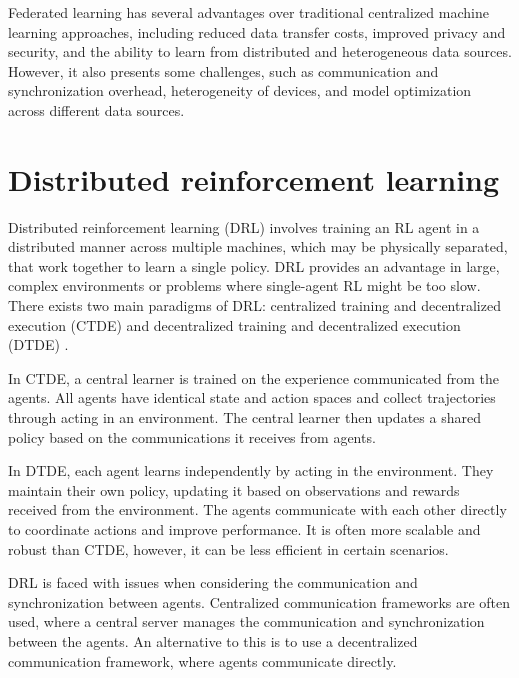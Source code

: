 
Federated learning has several advantages over traditional centralized machine learning approaches, including reduced data transfer costs, improved privacy and security, and the ability to learn from distributed and heterogeneous data sources. However, it also presents some challenges, such as communication and synchronization overhead, heterogeneity of devices, and model optimization across different data sources.

\section{Distributed reinforcement learning}

Distributed reinforcement learning (DRL) involves training an RL agent in a distributed manner across multiple machines, which may be physically separated, that work together to learn a single policy. DRL provides an advantage in large, complex environments or problems where single-agent RL might be too slow.
There exists two main paradigms of DRL: centralized training and decentralized execution (CTDE) and decentralized training and decentralized execution (DTDE) \cite{DRLSurvey}.

In CTDE, a central learner is trained on the experience communicated from the agents. All agents have identical state and action spaces and collect trajectories through acting in an environment. The central learner then updates a shared policy based on the communications it receives from agents. 

In DTDE, each agent learns independently by acting in the environment. They maintain their own policy, updating it based on observations and rewards received from the environment. The agents communicate with each other directly to coordinate actions and improve performance. It is often more scalable and robust than CTDE, however, it can be less efficient in certain scenarios.

DRL is faced with issues when considering the communication and synchronization between agents. Centralized communication frameworks are often used, where a central server manages the communication and synchronization between the agents. An alternative to this is to use a decentralized communication framework, where agents communicate directly.

